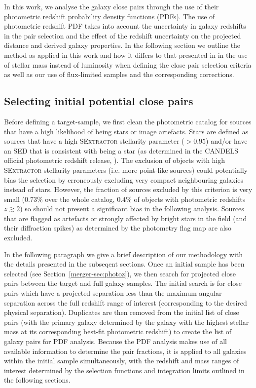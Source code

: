 
In this work, we analyse the galaxy close pairs through the use of their photometric redshift probability density functions (PDFs). The use of photometric redshift PDF takes into account the uncertainty in galaxy redshifts in the pair selection and the effect of the redshift uncertainty on the projected distance and derived galaxy properties. In the following section we outline the method as applied in this work and how it differs to that presented in  in the use of stellar mass instead of luminosity when defining the close pair selection criteria as well as our use of flux-limited samples and the corresponding corrections.

\subsection{Selecting initial potential close pairs}\label{merger-sec:initial}
Before defining a target-sample, we first clean the photometric catalog for sources that have a high likelihood of being stars or image artefacts. Stars are defined as sources that have a high \textsc{SExtractor} stellarity parameter ($> 0.95$) and/or have an SED that is consistent with being a star (as determined in the CANDELS official photometric redshift release, \citet{Dahlen:2013eu}). The exclusion of objects with high \textsc{SExtractor} stellarity parameters (i.e. more point-like sources) could potentially bias the selection by erroneously excluding very compact neighbouring galaxies instead of stars. However, the fraction of sources excluded by this criterion is very small ($0.73\%$ over the whole catalog, $0.4\%$ of objects with photometric redshifts $z \gtrsim 2$) so should not present a significant bias in the following analysis. Sources that are flagged as artefacts or strongly affected by bright stars in the field (and their diffraction spikes) as determined by the photometry flag map \citep{Guo:2013ig} are also excluded. 

In the following paragraph we give a brief description of our methodology with the details presented in the subseqent sections. Once an initial sample has been selected (see Section~\ref{merger-sec:photoz}), we then search for projected close pairs between the target and full galaxy samples. The initial search is for close pairs which have a projected separation less than the maximum angular separation across the full redshift range of interest (corresponding to the desired physical separation). Duplicates are then removed from the initial list of close pairs (with the primary galaxy determined by the galaxy with the highest stellar mass at its corresponding best-fit photometric redshift) to create the list of galaxy pairs for PDF analysis. Because the PDF analysis makes use of all available information to determine the pair fractions, it is applied to all galaxies within the initial sample simultaneously, with the redshift and mass ranges of interest determined by the selection functions and integration limits outlined in the following sections.


